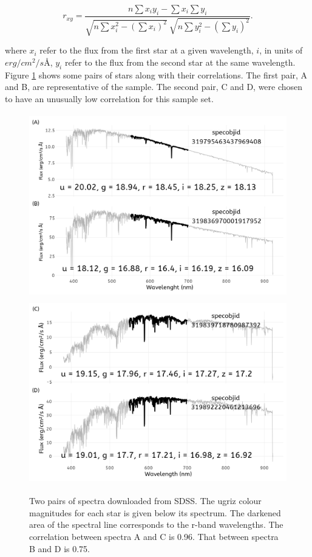 \documentclass[]{elsarticle} %
\begin{document}
\begin{equation}
  \displaystyle r_{xy}={\frac {n\sum x_{i}y_{i}-\sum x_{i}\sum y_{i}}{{\sqrt {n\sum x_{i}^{2}-\left(\sum x_{i}\right)^{2}}}~{\sqrt {n\sum y_{i}^{2}-\left(\sum y_{i}\right)^{2}}}}}.
  \label{eq:correlation}
\end{equation}

where \(x_i\) refer to the flux from the first star at a given
wavelength, \(i\), in units of \(erg/cm^2/s Å\), \(y_i\) refer to the
flux from the second star at the same wavelength. Figure
\ref{fig:spectra} shows some pairs of stars along with their
correlations. The first pair, A and B, are representative of the sample.
The second pair, C and D, were chosen to have an unusually low
correlation for this sample set.

\begin{figure}
  \includegraphics[width=\columnwidth, height = 8cm]{figures/spectra1}
  \includegraphics[width=\columnwidth, height = 8cm]{figures/spectra2}
    \caption{Two pairs of spectra downloaded from SDSS. The ugriz colour magnitudes for each star is given below its spectrum. The darkened area of the spectral line corresponds to the r-band wavelengths. The correlation between spectra A and C is 0.96. That between spectra B and D is 0.75.}
    \label{fig:spectra}
\end{figure}
\end{document}
